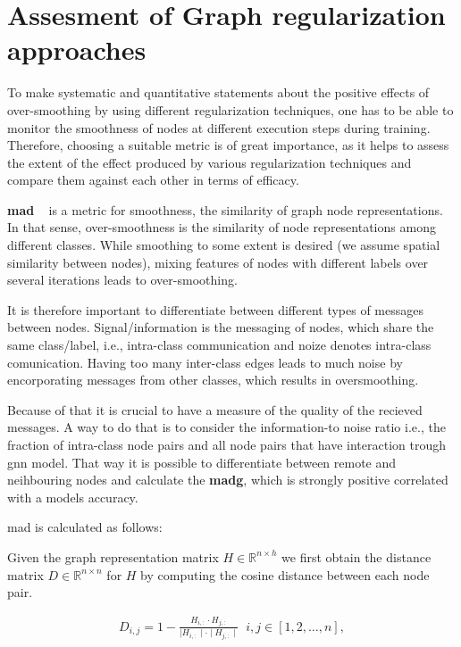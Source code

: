 \section{Assesment of Graph regularization approaches}
\label{sec:related:setup:choice:metrics}
To make systematic and quantitative statements about the positive effects of over-smoothing by using different regularization techniques, one has to be able to monitor the smoothness of nodes at different execution steps during training. Therefore, choosing a suitable metric is of great importance, as it helps to assess the extent of the effect produced by various regularization techniques and compare them against each other in terms of efficacy.

\textbf{\Ac{mad}} ~\cite{Chen2020} is a metric for smoothness, the similarity of graph node representations. In that sense, over-smoothness is the similarity of node representations among different classes. While smoothing to some extent is desired (we assume spatial similarity between nodes), mixing features of nodes with different labels over several iterations leads to over-smoothing.

It is therefore important to differentiate between different types of messages between nodes. Signal/information is the messaging of nodes, which share the same class/label, i.e., intra-class communication and noize denotes intra-class comunication. Having too many inter-class edges leads to much noise by encorporating messages from other classes, which results in oversmoothing.

Because of that it is crucial to have a measure of the quality of the recieved messages. A way to do that is to consider the information-to noise ratio i.e., the fraction of intra-class node pairs and all node pairs that have interaction trough \ac{gnn} model. That way it is possible to differentiate between remote and neihbouring nodes and calculate the \textbf{\ac{madg}}, which is strongly positive correlated with a models accuracy.

\ac{mad} is calculated as follows:

Given the graph representation matrix $H \in \mathbb{R}^{n \times h}$ we
first obtain the distance matrix $D \in \mathbb{R}^{n \times n}$ for $H$ by
computing the cosine distance between each node pair.

\begin{align*}
    D_{i,j} = 1 - \frac{H_{i,:} \cdot H_{j,:}}{\mid H_{i,:}\mid  \cdot \mid H_{j,:}\mid} \; \;  i,j \in [1,2, \dots, n],
\end{align*}

